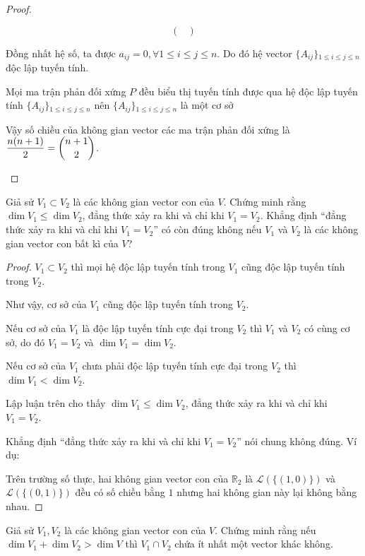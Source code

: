 \documentclass[class=linearalgebra,crop=false]{standalone}
\begin{document}
\begin{proof}
\begin{enumerate}
\[\begin{pmatrix}
                \end{pmatrix}
            \]
            \par Đồng nhất hệ số, ta được $a_{ij} = 0, \forall 1\le i\le j\le n$. Do đó hệ vector $\{ A_{ij} \}{}_{1\le i \le j \le n}$ độc lập tuyến tính.
            \par Mọi ma trận phản đối xứng $P$ đều biểu thị tuyến tính được qua hệ độc lập tuyến tính $\{ A_{ij} \}{}_{1\le i \le j \le n}$ nên $\{ A_{ij} \}{}_{1\le i \le j\le n}$ là một cơ sở
            \par Vậy số chiều của không gian vector các ma trận phản đối xứng là $\dfrac{n(n + 1)}{2} = \dbinom{n+1}{2}$.
    \end{enumerate}
\end{proof}

\begin{exercise}Giả sử $V_{1}\subset V_{2}$ là các không gian vector con của $V$. Chứng minh rằng $\dim V_{1} \le \dim V_{2}$, đẳng thức xảy ra khi và chỉ khi $V_{1} = V_{2}$. Khẳng định ``đẳng thức xảy ra khi và chỉ khi $V_{1} = V_{2}$'' có còn đúng không nếu $V_{1}$ và $V_{2}$ là các không gian vector con bất kì của $V$?
\end{exercise}

\begin{proof}$V_{1}\subset V_{2}$ thì mọi hệ độc lập tuyến tính trong $V_{1}$ cũng độc lập tuyến tính trong $V_{2}$.
    \par Như vậy, cơ sở của $V_{1}$ cũng độc lập tuyến tính trong $V_{2}$.
    \par Nếu cơ sở của $V_{1}$ là độc lập tuyến tính cực đại trong $V_{2}$ thì $V_{1}$ và $V_{2}$ có cùng cơ sở, do đó $V_{1} = V_{2}$ và $\dim V_{1} = \dim V_{2}$.
    \par Nếu cơ sở của $V_{1}$ chưa phải độc lập tuyến tính cực đại trong $V_{2}$ thì $\dim V_{1} < \dim V_{2}$.
    \par Lập luận trên cho thấy $\dim V_{1} \le \dim V_{2}$, đẳng thức xảy ra khi và chỉ khi $V_{1} = V_{2}$.
    \par Khẳng định ``đẳng thức xảy ra khi và chỉ khi $V_{1} = V_{2}$'' nói chung không đúng. Ví dụ:
    \par Trên trường số thực, hai không gian vector con của $\mathbb{R}_{2}$ là $\mathcal{L}(\{ (1,0) \})$ và $\mathcal{L}(\{ (0,1) \})$ đều có số chiều bằng $1$ nhưng hai không gian này lại không bằng nhau.
\end{proof}

\begin{exercise}Giả sử $V_{1}, V_{2}$ là các không gian vector con của $V$. Chứng minh rằng nếu $\dim V_{1} + \dim V_{2} > \dim V$ thì $V_{1}\cap V_{2}$ chứa ít nhất một vector khác không.
\end{exercise}
\end{document}
